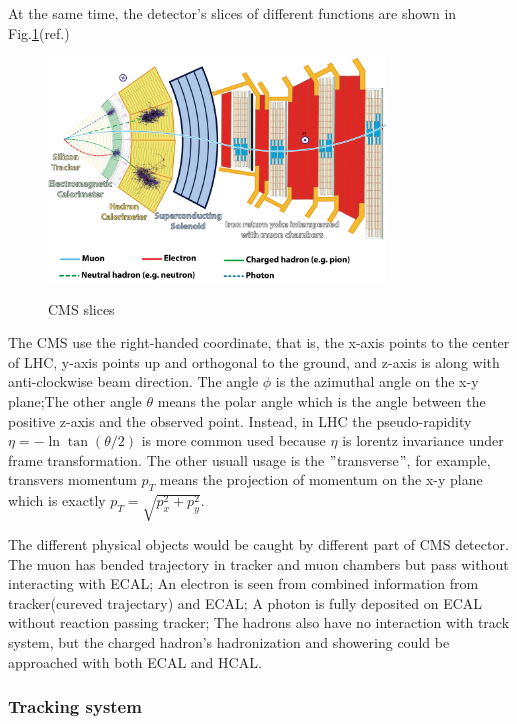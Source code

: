 		At the same time, the detector's slices of different functions are shown in Fig.\ref{ExpApp:fig:CMS_slices}(ref.\cite{Barney:2120661})

		\begin{figure}[H]
		\centering{}
	    	\includegraphics[width=0.8\textwidth]{Figures/ExpApparatus/CMSslice_whiteBackground.png}\\
		\caption{CMS slices\cite{Barney:2120661}}
		\label{ExpApp:fig:CMS_slices}
		\end{figure}
		\FloatBarrier

		The CMS use the right-handed coordinate, that is, the x-axis points to the center of LHC, y-axis points up and orthogonal to the ground, and z-axis is along with anti-clockwise beam direction. The angle $\phi$ is the azimuthal angle on the x-y plane;The other angle $\theta$ means the polar angle which is the angle between the positive z-axis and the observed point. Instead, in LHC the pseudo-rapidity $\eta = -\ln{\tan{(\theta/2)}}$ is more common used because $\eta$ is lorentz invariance under frame transformation. The other usuall usage is the $"$transverse$"$, for example, transvers momentum $p_T$ means the projection of momentum on the x-y plane which is exactly $p_T = \sqrt{p_x^2 + p_y^2}$.

		The different physical objects would be caught by different part of CMS detector. The muon has bended trajectory in tracker and muon chambers but pass without interacting with ECAL; An electron is seen from combined information from tracker(cureved trajectary) and ECAL; A photon is fully deposited on ECAL without reaction passing tracker; The hadrons also have no interaction with track system, but the charged hadron's hadronization and showering could be approached with both ECAL and HCAL.

		\subsubsection{Tracking system}
		\label{sssec:ExpApp_tracking}

